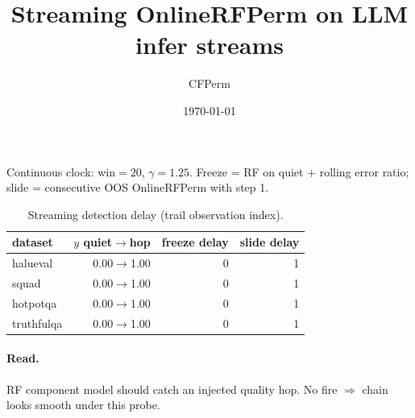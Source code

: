 \documentclass[11pt]{article}
\title{Streaming OnlineRFPerm on LLM infer streams}
\author{CFPerm}
\date{\today}
\begin{document}
\maketitle
Continuous clock: win$=20$, $\gamma=1.25$. Freeze = RF on quiet + rolling error ratio; slide = consecutive OOS OnlineRFPerm with step 1.
\begin{table}[h]\centering
\caption{Streaming detection delay (trail observation index).}
\begin{tabular}{lrrr}
\toprule dataset & $y$ quiet$\to$hop & freeze delay & slide delay \\
\midrule
halueval & 0.00$\to$1.00 & 0 & 1 \\
squad & 0.00$\to$1.00 & 0 & 1 \\
hotpotqa & 0.00$\to$1.00 & 0 & 1 \\
truthfulqa & 0.00$\to$1.00 & 0 & 1 \\
\bottomrule\end{tabular}\end{table}
\paragraph{Read.}
RF component model should catch an injected quality hop. No fire $\Rightarrow$ chain looks smooth under this probe.
\end{document}
